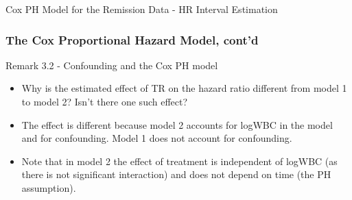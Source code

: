 \documentclass{beamer}
\theoremstyle{definition}
\begin{document}
\begin{frame}
\begin{block}{Cox PH Model for the Remission Data - HR Interval Estimation}
\begin{frame}
\frametitle{The Cox Proportional Hazard Model, cont'd}
\begin{block}{Remark 3.2 - Confounding and the Cox PH model}
\begin{itemize}
\item  Why is the estimated effect of TR on the hazard ratio different from model 1 to model 2? Isn't there one such effect?
\item The effect is different because model 2 accounts for logWBC in the model and for confounding.  Model 1 does not account for confounding.
\item Note that in model 2 the effect of treatment is independent of logWBC (as there is not significant interaction) and does not depend on time (the PH assumption).
\end{itemize}
\end{block}
\end{frame}






\end{block}
\end{frame}
\end{document}
